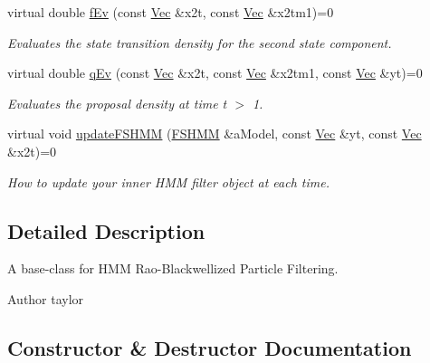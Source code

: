 \begin{DoxyCompactItemize}
virtual double \hyperlink{classHmm__Rbpf_a9964a93b3eabddbafd2b3fd6cbaead94}{f\+Ev} (const \hyperlink{pmfs_8h_a4c7df05c6f5e8a0d15ae14bcdbc07152}{Vec} \&x2t, const \hyperlink{pmfs_8h_a4c7df05c6f5e8a0d15ae14bcdbc07152}{Vec} \&x2tm1)=0
\begin{DoxyCompactList}\small\item\em Evaluates the state transition density for the second state component. \end{DoxyCompactList}\item 
virtual double \hyperlink{classHmm__Rbpf_ad1088176f3f3b7c86dce48de66ccd31c}{q\+Ev} (const \hyperlink{pmfs_8h_a4c7df05c6f5e8a0d15ae14bcdbc07152}{Vec} \&x2t, const \hyperlink{pmfs_8h_a4c7df05c6f5e8a0d15ae14bcdbc07152}{Vec} \&x2tm1, const \hyperlink{pmfs_8h_a4c7df05c6f5e8a0d15ae14bcdbc07152}{Vec} \&yt)=0
\begin{DoxyCompactList}\small\item\em Evaluates the proposal density at time t $>$ 1. \end{DoxyCompactList}\item 
virtual void \hyperlink{classHmm__Rbpf_aafd7e87c211684e8c4692646e46785ba}{update\+F\+S\+H\+MM} (\hyperlink{classFSHMM}{F\+S\+H\+MM} \&a\+Model, const \hyperlink{pmfs_8h_a4c7df05c6f5e8a0d15ae14bcdbc07152}{Vec} \&yt, const \hyperlink{pmfs_8h_a4c7df05c6f5e8a0d15ae14bcdbc07152}{Vec} \&x2t)=0
\begin{DoxyCompactList}\small\item\em How to update your inner H\+MM filter object at each time. \end{DoxyCompactList}\end{DoxyCompactItemize}


\subsection{Detailed Description}
A base-\/class for H\+MM Rao-\/\+Blackwellized Particle Filtering. 

\begin{DoxyAuthor}{Author}
taylor 
\end{DoxyAuthor}


\subsection{Constructor \& Destructor Documentation}
